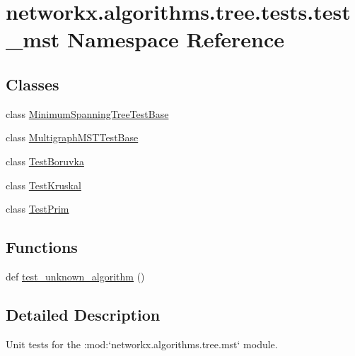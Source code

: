 \hypertarget{namespacenetworkx_1_1algorithms_1_1tree_1_1tests_1_1test__mst}{}\section{networkx.\+algorithms.\+tree.\+tests.\+test\+\_\+mst Namespace Reference}
\label{namespacenetworkx_1_1algorithms_1_1tree_1_1tests_1_1test__mst}
\subsection*{Classes}
\begin{DoxyCompactItemize}
\item 
class \hyperlink{classnetworkx_1_1algorithms_1_1tree_1_1tests_1_1test__mst_1_1MinimumSpanningTreeTestBase}{Minimum\+Spanning\+Tree\+Test\+Base}
\item 
class \hyperlink{classnetworkx_1_1algorithms_1_1tree_1_1tests_1_1test__mst_1_1MultigraphMSTTestBase}{Multigraph\+M\+S\+T\+Test\+Base}
\item 
class \hyperlink{classnetworkx_1_1algorithms_1_1tree_1_1tests_1_1test__mst_1_1TestBoruvka}{Test\+Boruvka}
\item 
class \hyperlink{classnetworkx_1_1algorithms_1_1tree_1_1tests_1_1test__mst_1_1TestKruskal}{Test\+Kruskal}
\item 
class \hyperlink{classnetworkx_1_1algorithms_1_1tree_1_1tests_1_1test__mst_1_1TestPrim}{Test\+Prim}
\end{DoxyCompactItemize}
\subsection*{Functions}
\begin{DoxyCompactItemize}
\item 
def \hyperlink{namespacenetworkx_1_1algorithms_1_1tree_1_1tests_1_1test__mst_ade001033e6008466dfceb8f09dde3eac}{test\+\_\+unknown\+\_\+algorithm} ()
\end{DoxyCompactItemize}


\subsection{Detailed Description}
\begin{DoxyVerb}Unit tests for the :mod:`networkx.algorithms.tree.mst` module.\end{DoxyVerb}
 

